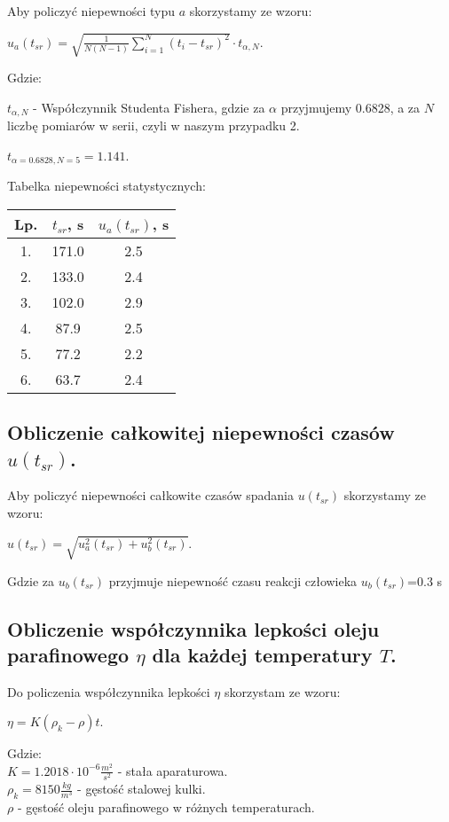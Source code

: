 \documentclass[12pt]{article}
\begin{document}
Aby policzyć niepewności typu $a$ skorzystamy ze wzoru:
\begin{center}
    $u_a(t_{sr}) = \sqrt{\frac{1}{N(N-1)} \displaystyle\sum_{i=1}^{N} (t_i - t_{sr})^2} \cdot t_{\alpha, N}$.
\end{center}
Gdzie:
\begin{flushleft}
    $t_{\alpha, N}$ - Współczynnik Studenta Fishera, gdzie za $\alpha$ przyjmujemy 0.6828, a za $N$
    liczbę pomiarów w serii, czyli w naszym przypadku 2.
\end{flushleft}
\begin{center}
    $t_{\alpha=0.6828,N=5} = 1.141$.
\end{center}
Tabelka niepewności statystycznych:
\begin{center}
    \begin{tabular}{ | c | c | c | }
        \hline
        Lp. & $t_{sr}$, s & $u_a(t_{sr})$, s \\ \hline
        1.  & 171.0    & 2.5           \\ \hline
        2.  & 133.0    & 2.4           \\ \hline
        3.  & 102.0    & 2.9           \\ \hline
        4.  & 87.9     & 2.5           \\ \hline
        5.  & 77.2     & 2.2           \\ \hline
        6.  & 63.7     & 2.4           \\ \hline
    \end{tabular}
\end{center}
\subsection*{Obliczenie całkowitej niepewności czasów $u(t_{sr})$.}
Aby policzyć niepewności całkowite czasów spadania $u(t_{sr})$
skorzystamy ze wzoru:
\begin{center}
    $u(t_{sr}) = \sqrt{u_a^2(t_{sr}) + u_b^2(t_{sr})}$.
\end{center}
Gdzie za $u_b(t_{sr})$ przyjmuje niepewność czasu reakcji
człowieka $u_b(t_{sr})$=0.3 s

\subsection*{Obliczenie współczynnika lepkości oleju
    parafinowego $\eta$ dla każdej temperatury $T$.}

Do policzenia współczynnika lepkości $\eta$ skorzystam
ze wzoru:
\begin{center}
    $\eta = K(\rho_k - \rho)t$.
\end{center}
Gdzie: \\
\indent $K=1.2018 \cdot 10^{-6} \frac{m^2}{s^2}$ - stała aparaturowa. \\
\indent $\rho_k = 8150 \frac{kg}{m^3}$ - gęstość stalowej kulki. \\
\indent $\rho$ - gęstość oleju parafinowego w różnych temperaturach.
\end{document}
